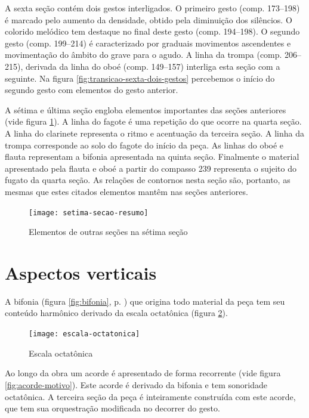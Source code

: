 A sexta seção contém dois gestos interligados. O primeiro gesto
(comp. 173--198) é marcado pelo aumento da densidade, obtido pela
diminuição dos silêncios. O colorido melódico tem destaque no final
deste gesto (comp. 194--198). O segundo gesto (comp. 199--214) é
caracterizado por graduais movimentos ascendentes e movimentação do
âmbito do grave para o agudo. A linha da trompa (comp. 206--215),
derivada da linha do oboé (comp. 149--157) interliga esta seção com a
seguinte. Na figura \ref{fig:transicao-sexta-dois-gestos} percebemos o
início do segundo gesto com elementos do gesto anterior.

A sétima e última seção engloba elementos importantes das seções
anteriores (vide figura \ref{fig:setima-secao-resumo}). A linha do
fagote é uma repetição do que ocorre na quarta seção. A linha do
clarinete representa o ritmo e acentuação da terceira seção. A linha
da trompa corresponde ao solo do fagote do início da peça. As linhas
do oboé e flauta representam a bifonia apresentada na quinta
seção. Finalmente o material apresentado pela flauta e oboé a partir
do compasso 239 representa o sujeito do fugato da quarta seção. As
relações de contornos nesta seção são, portanto, as mesmas que estes
citados elementos mantêm nas seções anteriores.

\begin{figure}
  \centering
  \texttt{[image: setima-secao-resumo]}
  \caption{Elementos de outras seções na sétima seção}
  \label{fig:setima-secao-resumo}
\end{figure}
\section{Aspectos verticais}
\label{sec:aspectos-verticais}

A bifonia (figura \ref{fig:bifonia}, p. \pageref{fig:bifonia}) que
origina todo material da peça tem seu conteúdo harmônico derivado da
escala octatônica (figura \ref{fig:escala-octatonica}).

\begin{figure}
  \centering
  \texttt{[image: escala-octatonica]}
  \caption{Escala octatônica}
  \label{fig:escala-octatonica}
\end{figure}

Ao longo da obra um acorde é apresentado de forma recorrente (vide
figura \ref{fig:acorde-motivo}). Este acorde é derivado da bifonia e
tem sonoridade octatônica. A terceira seção da peça é inteiramente
construída com este acorde, que tem sua orquestração modificada no
decorrer do gesto.

